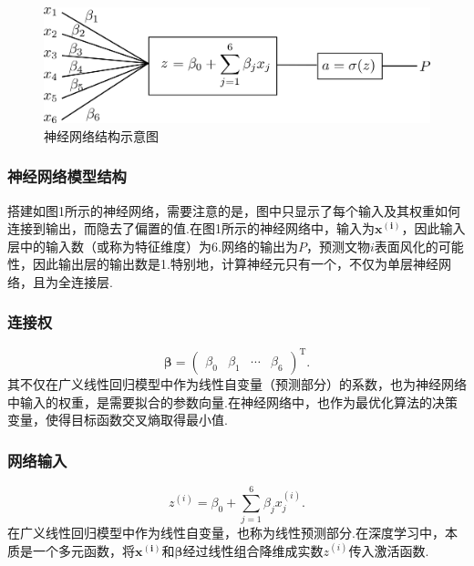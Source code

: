 \begin{figure}[!htp]
	\includegraphics[width=16cm]{figure/node.png}
	\caption{神经网络结构示意图}
\end{figure}

\subsubsection{神经网络模型结构}

搭建如图1所示的神经网络，需要注意的是，图中只显示了每个输入及其权重如何连接到输出，而隐去了偏置的值.在图1所示的神经网络中，输入为$\boldsymbol{x^{(i)}}$，因此输入层中的输入数（或称为特征维度）为6.网络的输出为$P$，预测文物$i$表面风化的可能性，因此输出层的输出数是1.特别地，计算神经元只有一个，不仅为单层神经网络，且为全连接层.

\subsubsection{连接权}

\begin{equation}
	\boldsymbol{\beta}= \left(\begin{array}{cccc}
     \beta_0 & \beta_1 & \cdots & \beta_6
   \end{array}\right)^{\mathrm{T}}.
\end{equation}
其不仅在广义线性回归模型中作为线性自变量（预测部分）的系数，也为神经网络中输入的权重，是需要拟合的参数向量.在神经网络中，也作为最优化算法的决策变量，使得目标函数交叉熵取得最小值.

\subsubsection{网络输入}

\begin{equation}
	z^{(i)} = \beta_0 + \sum^6_{j = 1} \beta_j x^{(i)}_j.
\end{equation}
在广义线性回归模型中作为线性自变量，也称为线性预测部分.在深度学习中，本质是一个多元函数，将$\boldsymbol{x^{(i)}}$和$\boldsymbol{\beta}$经过线性组合降维成实数$z^{(i)}$传入激活函数.

